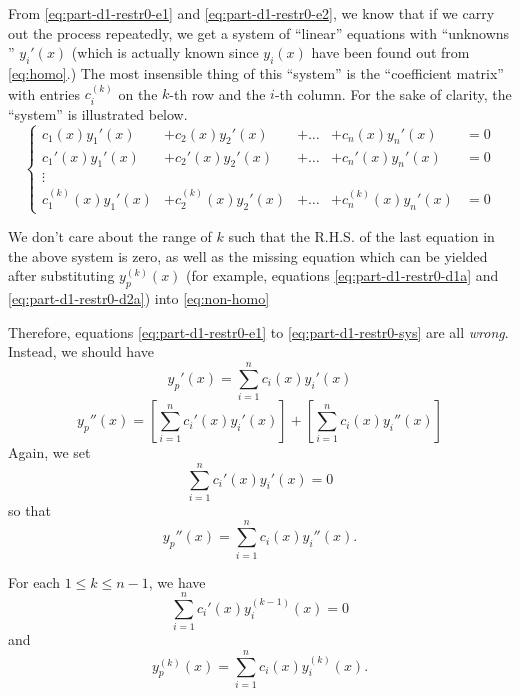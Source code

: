 \documentclass[a4paper,12pt]{article}
\begin{document}
From \eqref{eq:part-d1-restr0-e1} and \eqref{eq:part-d1-restr0-e2}, we
know that if we carry out the process repeatedly, we get a system of
``linear'' equations with ``unknowns '' $y_i'(x)$ (which is actually
known since $y_i(x)$ have been found out from \eqref{eq:homo}.) The
most insensible thing of this ``system'' is the ``coefficient matrix''
with entries $c_i^{(k)}$ on the $k$-th row and the $i$-th column. For
the sake of clarity, the ``system'' is illustrated below.
\begin{equation*}
  \left\{\begin{aligned}
    c_1(x) y_1'(x) &+ c_2(x) y_2'(x) &+ \dots &+ c_n(x) y_n'(x) &= 0\\
    c_1'(x) y_1'(x) &+ c_2'(x) y_2'(x) &+ \dots &+ c_n'(x) y_n'(x) &=
    0\\ \vdots\\ c_1^{(k)}(x) y_1'(x) &+ c_2^{(k)}(x) y_2'(x) &+ \dots
    &+ c_n^{(k)}(x) y_n'(x) &= 0
  \end{aligned}\right.
  \tag{*}
  \label{eq:part-d1-restr0-sys}
\end{equation*}

We don't care about the range of $k$ such that the R.H.S. of the
last equation in the above system is zero, as well as the missing
equation which can be yielded after substituting $y_p^{(k)}(x)$ (for
example, equations \eqref{eq:part-d1-restr0-d1a} and
\eqref{eq:part-d1-restr0-d2a}) into \eqref{eq:non-homo}

Therefore, equations \eqref{eq:part-d1-restr0-e1} to
\eqref{eq:part-d1-restr0-sys} are all \emph{wrong}. Instead, we should
have
\begin{equation}
  \boxed{y_p'(x)=\sum_{i=1}^{n} c_i(x) y_i'(x)}
  \label{eq:part-d1a}
\end{equation}
\begin{equation}
  y_p''(x)=\left[ \sum_{i=1}^{n} c_i'(x) y_i'(x) \right]+\left[
  \sum_{i=1}^{n} c_i(x) y_i''(x) \right]
  \label{eq:part-d2}
\end{equation}
Again, we set
\begin{equation}
  \boxed{\sum_{i=1}^{n} c_i'(x) y_i'(x)=0}
  \label{eq:part-d2-restr}
\end{equation}
so that
\begin{equation}
  \boxed{y_p''(x)=\sum_{i=1}^{n} c_i(x) y_i''(x).}
  \label{eq:part-d2a}
\end{equation}

For each $1 \le k \le n-1$, we have
\begin{equation}
  \boxed{\sum_{i=1}^{n} c_i'(x) y_i^{(k-1)}(x)=0}
  \label{eq:part-dk-restr}
\end{equation}
and
\begin{equation}
  \boxed{y_p^{(k)}(x)=\sum_{i=1}^{n} c_i(x) y_i^{(k)}(x).}
  \label{eq:part-dka}
\end{equation}
\end{document}
